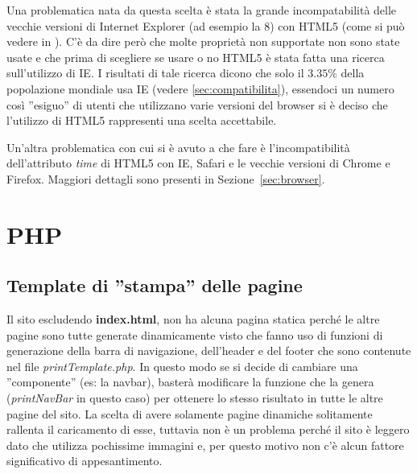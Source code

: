\documentclass[10pt, a4paper]{article}
\begin{document}
Una problematica nata da questa scelta è stata la grande incompatabilità delle vecchie versioni di Internet Explorer (ad esempio la 8)
con HTML5 (come si può vedere in \cite{IE supporto HTML5}). C'è da dire però che molte
proprietà non supportate non sono state usate e che prima di scegliere se usare o no
HTML5 è stata fatta una ricerca sull'utilizzo di IE. I risultati di tale ricerca dicono che solo
il $3.35\%$ della popolazione mondiale usa IE (vedere \ref{sec:compatibilita}), essendoci un
numero così ''esiguo'' di utenti che utilizzano varie versioni del browser si è deciso che l'utilizzo
di HTML5 rappresenti una scelta accettabile.

Un'altra problematica con cui si è avuto a che fare è l'incompatibilità dell'attributo \emph{time} di HTML5 con IE, Safari e le vecchie versioni di Chrome e Firefox.
Maggiori dettagli sono presenti in Sezione~\ref{sec:browser}. 
\section{PHP}
\subsection{Template di ''stampa'' delle pagine}
Il sito escludendo \textbf{index.html}, non ha alcuna pagina statica perché le altre pagine sono tutte generate dinamicamente visto che fanno uso
di funzioni di generazione della barra di navigazione, dell'header e del footer che sono
contenute nel file \emph{printTemplate.php}. In questo modo se si decide di cambiare una
''componente'' (es: la navbar), basterà modificare la funzione che la genera (\emph{printNavBar}
in questo caso) per ottenere lo stesso risultato in tutte le altre pagine del sito. La scelta di avere solamente pagine dinamiche solitamente rallenta il caricamento di esse, tuttavia non è un problema perché il sito è leggero dato che utilizza pochissime immagini e, per questo motivo non c'è alcun fattore significativo di appesantimento.
\end{document}
